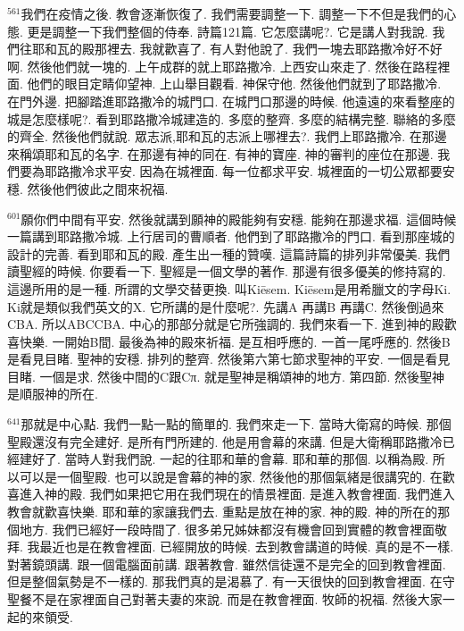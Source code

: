 \documentclass{book}
\begin{document}
$^{561}$我們在疫情之後.
教會逐漸恢復了.
我們需要調整一下.
調整一下不但是我們的心態.
更是調整一下我們整個的侍奉.
詩篇121篇.
它怎麼講呢?.
它是講人對我說.
我們往耶和瓦的殿那裡去.
我就歡喜了.
有人對他說了.
我們一塊去耶路撒冷好不好啊.
然後他們就一塊的.
上午成群的就上耶路撒冷.
上西安山來走了.
然後在路程裡面.
他們的眼目定睛仰望神.
上山舉目觀看.
神保守他.
然後他們就到了耶路撒冷.
在門外邊.
把腳踏進耶路撒冷的城門口.
在城門口那邊的時候.
他遠遠的來看整座的城是怎麼樣呢?.
看到耶路撒冷城建造的.
多麼的整齊.
多麼的結構完整.
聯絡的多麼的齊全.
然後他們就說.
眾志派,耶和瓦的志派上哪裡去?.
我們上耶路撒冷.
在那邊來稱頌耶和瓦的名字.
在那邊有神的同在.
有神的寶座.
神的審判的座位在那邊.
我們要為耶路撒冷求平安.
因為在城裡面.
每一位都求平安.
城裡面的一切公眾都要安穩.
然後他們彼此之間來祝福.

$^{601}$願你們中間有平安.
然後就講到願神的殿能夠有安穩.
能夠在那邊求福.
這個時候一篇講到耶路撒冷城.
上行居司的曹順者.
他們到了耶路撒冷的門口.
看到那座城的設計的完善.
看到耶和瓦的殿.
產生出一種的贊嘆.
這篇詩篇的排列非常優美.
我們讀聖經的時候.
你要看一下.
聖經是一個文學的著作.
那邊有很多優美的修持寫的.
這邊所用的是一種.
所謂的文學交替更換.
叫Kiēsem.
Kiēsem是用希臘文的字母Ki.
Ki就是類似我們英文的X.
它所講的是什麼呢?.
先講A 再講B 再講C.
然後倒過來CBA.
所以ABCCBA.
中心的那部分就是它所強調的.
我們來看一下.
進到神的殿歡喜快樂.
一開始B間.
最後為神的殿來祈福.
是互相呼應的.
一首一尾呼應的.
然後B是看見目睹.
聖神的安穩.
排列的整齊.
然後第六第七節求聖神的平安.
一個是看見目睹.
一個是求.
然後中間的C跟Cπ.
就是聖神是稱頌神的地方.
第四節.
然後聖神是順服神的所在.

$^{641}$那就是中心點.
我們一點一點的簡單的.
我們來走一下.
當時大衛寫的時候.
那個聖殿還沒有完全建好.
是所有門所建的.
他是用會幕的來講.
但是大衛稱耶路撒冷已經建好了.
當時人對我們說.
一起的往耶和華的會幕.
耶和華的那個.
以稱為殿.
所以可以是一個聖殿.
也可以說是會幕的神的家.
然後他的那個氣緒是很講究的.
在歡喜進入神的殿.
我們如果把它用在我們現在的情景裡面.
是進入教會裡面.
我們進入教會就歡喜快樂.
耶和華的家讓我們去.
重點是放在神的家.
神的殿.
神的所在的那個地方.
我們已經好一段時間了.
很多弟兄姊妹都沒有機會回到實體的教會裡面敬拜.
我最近也是在教會裡面.
已經開放的時候.
去到教會講道的時候.
真的是不一樣.
對著鏡頭講.
跟一個電腦面前講.
跟著教會.
雖然信徒還不是完全的回到教會裡面.
但是整個氣勢是不一樣的.
那我們真的是渴慕了.
有一天很快的回到教會裡面.
在守聖餐不是在家裡面自己對著夫妻的來說.
而是在教會裡面.
牧師的祝福.
然後大家一起的來領受.
\end{document}
